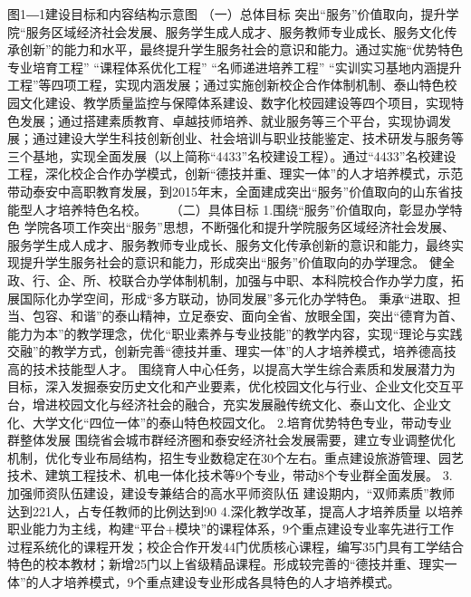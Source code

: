 图1―1建设目标和内容结构示意图
（一）总体目标
突出“服务”价值取向，提升学院“服务区域经济社会发展、服务学生成人成才、服务教师专业成长、服务文化传承创新”的能力和水平，最终提升学生服务社会的意识和能力。通过实施“优势特色专业培育工程” “课程体系优化工程” “名师递进培养工程” “实训实习基地内涵提升工程”等四项工程，实现内涵发展；通过实施创新校企合作体制机制、泰山特色校园文化建设、教学质量监控与保障体系建设、数字化校园建设等四个项目，实现特色发展；通过搭建素质教育、卓越技师培养、就业服务等三个平台，实现协调发展；通过建设大学生科技创新创业、社会培训与职业技能鉴定、技术研发与服务等三个基地，实现全面发展（以上简称“4433”名校建设工程）。通过“4433”名校建设工程，深化校企合作办学模式，创新“德技并重、理实一体”的人才培养模式，示范带动泰安中高职教育发展，到2015年末，全面建成突出“服务”价值取向的山东省技能型人才培养特色名校。　　
（二）具体目标
1.围绕“服务”价值取向，彰显办学特色
学院各项工作突出“服务”思想，不断强化和提升学院服务区域经济社会发展、服务学生成人成才、服务教师专业成长、服务文化传承创新的意识和能力，最终实现提升学生服务社会的意识和能力，形成突出“服务”价值取向的办学理念。                      
健全政、行、企、所、校联合办学体制机制，加强与中职、本科院校合作办学力度，拓展国际化办学空间，形成“多方联动，协同发展”多元化办学特色。
秉承“进取、担当、包容、和谐”的泰山精神，立足泰安、面向全省、放眼全国，突出“德育为首、能力为本”的教学理念，优化“职业素养与专业技能”的教学内容，实现“理论与实践交融”的教学方式，创新完善“德技并重、理实一体”的人才培养模式，培养德高技高的技术技能型人才。
围绕育人中心任务，以提高大学生综合素质和发展潜力为目标，深入发掘泰安历史文化和产业要素，优化校园文化与行业、企业文化交互平台，增进校园文化与经济社会的融合，充实发展融传统文化、泰山文化、企业文化、大学文化“四位一体”的泰山特色校园文化。
2.培育优势特色专业，带动专业群整体发展
围绕省会城市群经济圈和泰安经济社会发展需要，建立专业调整优化机制，优化专业布局结构，招生专业数稳定在30个左右。重点建设旅游管理、园艺技术、建筑工程技术、机电一体化技术等9个专业，带动8个专业群全面发展。
3.加强师资队伍建设，建设专兼结合的高水平师资队伍
建设期内，“双师素质”教师达到221人，占专任教师的比例达到90%
4.深化教学改革，提高人才培养质量
以培养职业能力为主线，构建“平台+模块”的课程体系，9个重点建设专业率先进行工作过程系统化的课程开发；校企合作开发44门优质核心课程，编写35门具有工学结合特色的校本教材；新增25门以上省级精品课程。形成较完善的“德技并重、理实一体”的人才培养模式，9个重点建设专业形成各具特色的人才培养模式。
